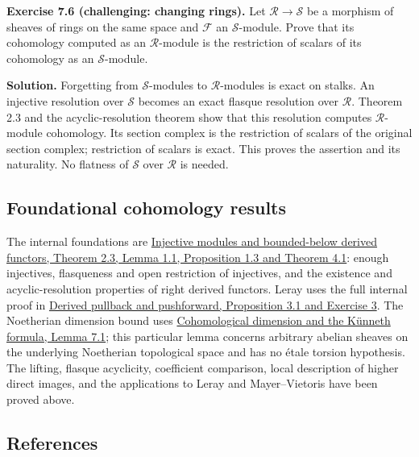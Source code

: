 \documentclass[11pt]{article}
\begin{document}
\textbf{Exercise 7.6 (challenging: changing rings).} Let
\(\mathcal R\to\mathcal S\) be a morphism of sheaves of rings on the
same space and \(\mathcal F\) an \(\mathcal S\)-module. Prove that its
cohomology computed as an \(\mathcal R\)-module is the restriction of
scalars of its cohomology as an \(\mathcal S\)-module.

\textbf{Solution.} Forgetting from \(\mathcal S\)-modules to
\(\mathcal R\)-modules is exact on stalks. An injective resolution over
\(\mathcal S\) becomes an exact flasque resolution over \(\mathcal R\).
Theorem 2.3 and the acyclic-resolution theorem show that this resolution
computes \(\mathcal R\)-module cohomology. Its section complex is the
restriction of scalars of the original section complex; restriction of
scalars is exact. This proves the assertion and its naturality. No
flatness of \(\mathcal S\) over \(\mathcal R\) is needed.

\subsection{Foundational cohomology
results}\label{foundational-cohomology-results}

The internal foundations are
\href{https://kokunoyumeto.github.io/open-math-courses/courses/derived-categories-and-sheaf-operations/injective-modules-and-bounded-below-derived-functors.html}{Injective
modules and bounded-below derived functors, Theorem 2.3, Lemma 1.1,
Proposition 1.3 and Theorem 4.1}: enough injectives, flasqueness and
open restriction of injectives, and the existence and acyclic-resolution
properties of right derived functors. Leray uses the full internal proof
in
\href{https://kokunoyumeto.github.io/open-math-courses/courses/derived-categories-and-sheaf-operations/derived-pullback-and-pushforward.html}{Derived
pullback and pushforward, Proposition 3.1 and Exercise 3}. The
Noetherian dimension bound uses
\href{https://kokunoyumeto.github.io/open-math-courses/courses/ag-etale-cohomology/cohomological-dimension-and-the-kunneth-formula.html\#7-the-bound-for-all-finite-type-schemes}{Cohomological
dimension and the Künneth formula, Lemma 7.1}; this particular lemma
concerns arbitrary abelian sheaves on the underlying Noetherian
topological space and has no étale torsion hypothesis. The lifting,
flasque acyclicity, coefficient comparison, local description of higher
direct images, and the applications to Leray and Mayer--Vietoris have
been proved above.

\subsection{References}\label{references}
\end{document}
